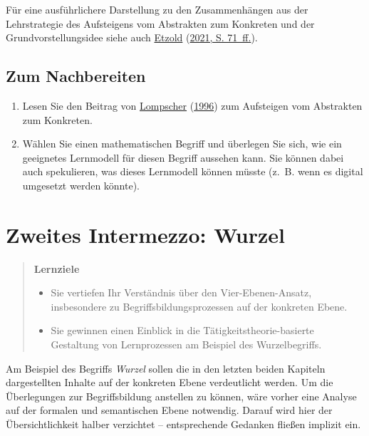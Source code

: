 \documentclass[
  ngerman,
]{scrbook}
\providecommand{\tightlist}{%
  \setlength{\itemsep}{0pt}\setlength{\parskip}{0pt}}
\theoremstyle{definition}
\theoremstyle{definition}
\theoremstyle{definition}
\theoremstyle{definition}
\theoremstyle{remark}
\begin{document}
Für eine ausführlichere Darstellung zu den Zusammenhängen aus der Lehrstrategie des Aufsteigens vom Abstrakten zum Konkreten und der Grundvorstellungsidee siehe auch \protect\hyperlink{ref-Etzold2021}{Etzold} (\protect\hyperlink{ref-Etzold2021}{2021, S. 71~ff.}).

\hypertarget{begriffe-lerntheoretisch-nachbereitung}{%
\section{Zum Nachbereiten}\label{begriffe-lerntheoretisch-nachbereitung}}

\begin{enumerate}
\def\labelenumi{\arabic{enumi}.}
\item
  Lesen Sie den Beitrag von \protect\hyperlink{ref-Lompscher1996}{Lompscher} (\protect\hyperlink{ref-Lompscher1996}{1996}) zum Aufsteigen vom Abstrakten zum Konkreten.
\item
  Wählen Sie einen mathematischen Begriff und überlegen Sie sich, wie ein geeignetes Lernmodell für diesen Begriff aussehen kann. Sie können dabei auch spekulieren, was dieses Lernmodell können müsste (z.~B. wenn es digital umgesetzt werden könnte).
\end{enumerate}

\hypertarget{zweites-intermezzo-wurzel}{%
\chapter{Zweites Intermezzo: Wurzel}\label{zweites-intermezzo-wurzel}}

\begin{quote}
\textbf{Lernziele}

\begin{itemize}
\tightlist
\item
  Sie vertiefen Ihr Verständnis über den Vier-Ebenen-Ansatz, insbesondere zu Begriffsbildungsprozessen auf der konkreten Ebene.
\item
  Sie gewinnen einen Einblick in die Tätigkeitstheorie-basierte Gestaltung von Lernprozessen am Beispiel des Wurzelbegriffs.
\end{itemize}
\end{quote}

Am Beispiel des Begriffs \emph{Wurzel} sollen die in den letzten beiden Kapiteln dargestellten Inhalte auf der \textcolor{concreteColor}{konkreten} Ebene verdeutlicht werden. Um die Überlegungen zur Begriffsbildung anstellen zu können, wäre vorher eine Analyse auf der \textcolor{formalColor}{formalen} und \textcolor{semanticColor}{semantischen} Ebene notwendig. Darauf wird hier der Übersichtlichkeit halber verzichtet -- entsprechende Gedanken fließen implizit ein.
\end{document}
